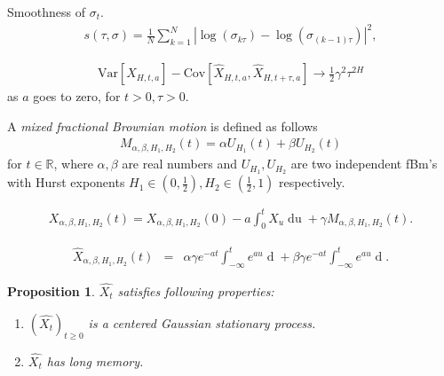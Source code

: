\documentclass[12pt]{beamer}
\newtheorem{proposition}{Proposition}
\begin{document}
\begin{frame}
  Smoothness of $\sigma_t$.
  \begin{eqnarray*}
  s(\tau, \sigma) = \frac{1}{N}\sum\limits_{k=1}^N|\log(\sigma_{k\tau}) - \log(\sigma_{(k-1)\tau})|^2,
  \label{sec:smo}
\end{eqnarray*}
\begin{theorem}
  \begin{eqnarray}
	\mathrm{Var}[\hat{X}_{H,t, a}] - \mathrm{Cov}[\hat{X}_{H,t, a}, \hat{X}_{H,t+\tau, a}] \rightarrow \frac{1}{2} \gamma^2\tau^{2H}
	\label{sec:rfsv}
  \end{eqnarray}
 as $a$ goes to zero, for $t>0, \tau>0$.
\end{theorem}
\end{frame}

\begin{frame}
  \begin{definition}
  A \emph{mixed fractional Brownian motion} is defined as follows
\begin{eqnarray}
  M_{\alpha,\beta,H_1,H_2}(t) = \alpha U_{H_1}(t) + \beta U_{H_2}(t)
  \label{sec:mfsv}
\end{eqnarray}
for $t\in \mathbb{R}$, where $\alpha, \beta$ are real numbers and $U_{H_1}, U_{H_2}$ are two independent fBm's with Hurst exponents $H_1 \in (0, \frac{1}{2}), H_2 \in (\frac{1}{2}, 1)$ respectively.
\end{definition}
\end{frame}

\begin{frame}
  \begin{eqnarray*}
	X_{\alpha,\beta,H_1,H_2}(t) = X_{\alpha,\beta,H_1,H_2}(0) - a\int_0^t X_u \mathop{du} + \gamma M_{\alpha,\beta,H_1,H_2}(t).
\end{eqnarray*}

\begin{eqnarray*}
  \hat{X}_{\alpha,\beta,H_1,H_2}(t) &=&  \alpha \gamma e^{-at}\int_{-\infty}^t e^{au} \mathop{d U_{H_1}} + \beta \gamma e^{-at}\int_{-\infty}^t e^{au} \mathop{d U_{H_2}}.
  \label{sec:jjj}
\end{eqnarray*}
\end{frame}

\begin{frame}
  \begin{proposition}
  $\hat{X_t}$ satisfies following properties:
\begin{enumerate}[topsep=0pt, itemsep=-1ex, partopsep=1ex, parsep=1ex, label=(\roman*)]
  \item $(\hat{X_t})_{t\ge 0}$ is a centered Gaussian stationary process.
  \item $\hat{X_t}$ has long memory.
  \end{enumerate}
\end{proposition}
\end{frame}
\end{document}

